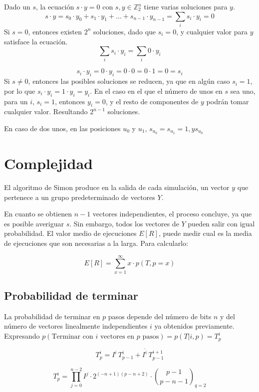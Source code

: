 \documentclass{article}
\theoremstyle{definition}
\begin{document}
Dado un $s$, la ecuación $s \cdot y = 0$ con $s, y \in \mathbb Z_2^n$ tiene 
varias soluciones para $y$.
$$ s \cdot y = s_0 \cdot y_0 + s_1 \cdot y_1 + \ldots + s_{n-1} \cdot y_{n-1} = 
\sum_{i}{s_i \cdot y_i} = 0$$
Si $s = 0$, entonces existen $2^n$ soluciones, dado que $s_i = 0$, y cualquier 
valor para $y$ satisface la ecuación.
$$ \sum_{i}{s_i \cdot y_i} = \sum_{i}{0 \cdot y_i} $$

$$ s_i \cdot y_i = 0 \cdot y_i = 0 \cdot 0 = 0 \cdot 1 = 0 = s_i$$
Si $s \neq 0$, entonces las posibles soluciones se reducen, ya que en algún caso 
$s_i = 1$, por lo que $s_i \cdot y_i = 1 \cdot y_i = y_i$.
En el caso en el que el número de unos en $s$ sea uno, para un $i$, $s_i = 1$, 
entonces $y_i = 0$, y el resto de componentes de $y$ podrán tomar cualquier 
valor. Resultando $2^{n-1}$ soluciones.

En caso de dos unos, en las posiciones $u_0$ y $u_1$, $s_{u_0} = s_{u_1} = 1, y 
s_{u_0}$

\section{Complejidad}

El algoritmo de Simon produce en la salida de cada simulación, un vector $y$ que
pertenece a un grupo predeterminado de vectores $Y$.

En cuanto se obtienen $n-1$ vectores independientes, el proceso concluye, ya que
es posible averiguar $s$. Sin embargo, todos los vectores de $Y$ pueden salir
con igual probabilidad. El valor medio de ejecuciones $E[R]$, puede medir cual
es la media de ejecuciones que son necesarias a la larga. Para calcularlo:

$$ E[R] = \sum^{\infty}_{x=1} x \cdot p(T, p=x) $$

\subsection{Probabilidad de terminar}

La probabilidad de terminar en $p$ pasos depende del número de bits $n$ y del 
número de vectores linealmente independientes $i$ ya obtenidos previamente.  
Expresando $p(\textrm{Terminar con $i$ vectores en $p$ pasos}) = p(T|i,p) = 
T^i_p$ 

$$T^i_p = I^i \, T^i_{p-1} + \overline{I^i} \, T^{i+1}_{p-1}$$

$$ T^i_p = \prod^{n-2}_{j=0} I^j \cdot 2^{(-n+1)(p-n+2)} \cdot {p-1 \choose 
p-n-1}_{q=2} $$
\end{document}
